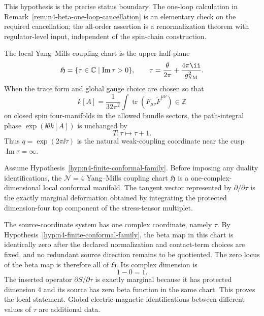 This hypothesis is the precise status boundary.  The one-loop calculation in
Remark~\ref{rem:n4-beta-one-loop-cancellation} is an elementary check on
the required cancellation; the all-order assertion is a renormalization
theorem with regulator-level input, independent of the spin-chain
construction.

\begin{definition}
\label{def:n4-coupling-chart}
The local Yang--Mills coupling chart is the upper half-plane
\[
  \mathfrak H=\{\tau\in\mathbb C\mid \operatorname{Im}\tau>0\},
  \qquad
  \tau=\frac{\theta}{2\pi}+\frac{4\pi\ii}{g_{\rm YM}^2}.
\]
When the trace form and global gauge choice are chosen so that
\[
  k[A]=\frac{1}{32\pi^2}\int\operatorname{tr}(F_{\mu\nu}\widetilde F^{\mu\nu})
  \in\mathbb Z
\]
on closed spin four-manifolds in the allowed bundle sectors, the path-integral
phase \(\exp(\ii\theta k[A])\) is unchanged by
\[
  T:\tau\longmapsto\tau+1 .
\]
Thus \(q=\exp(2\pi\ii\tau)\) is the natural weak-coupling coordinate near the
cusp \(\operatorname{Im}\tau=\infty\).
\end{definition}

\begin{remark}[Local \(\mathcal N=4\) conformal manifold]
\label{rem:n4-local-conformal-manifold}
Assume Hypothesis~\ref{hyp:n4-finite-conformal-family}.  Before imposing any
duality identifications, the \(\mathcal N=4\) Yang--Mills coupling chart
\(\mathfrak H\) is a one-complex-dimensional local conformal manifold.  The
tangent vector represented by \(\partial/\partial\tau\) is the exactly
marginal deformation obtained by integrating the protected dimension-four
top component of the stress-tensor multiplet.

The source-coordinate system has one complex coordinate, namely \(\tau\).  By
Hypothesis~\ref{hyp:n4-finite-conformal-family}, the beta map in this chart
is identically zero after the declared normalization and contact-term choices
are fixed, and no redundant source direction remains to be quotiented.  The
zero locus of the beta map is therefore all of \(\mathfrak H\).  Its complex
dimension is
\[
  1-0=1 .
\]
The inserted operator \(\partial S/\partial\tau\) is exactly marginal because
it has protected dimension \(4\) and its source has zero beta function in the
same chart.  This proves the local statement.  Global electric-magnetic
identifications between different values of \(\tau\) are additional data.
\end{remark}

